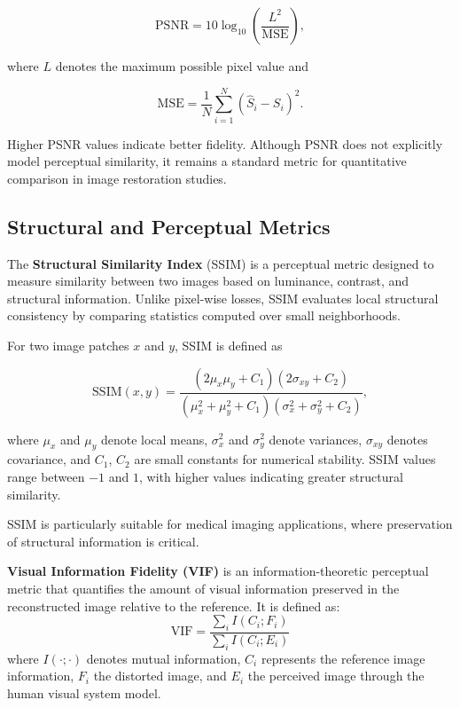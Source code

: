 \begin{equation}
\mathrm{PSNR} = 10 \log_{10} 
\left( \frac{L^2}{\mathrm{MSE}} \right),
\end{equation}

where $L$ denotes the maximum possible pixel value and

\begin{equation}
\mathrm{MSE} = \frac{1}{N} \sum_{i=1}^{N} 
(\hat{S}_i - S_i)^2.
\end{equation}

Higher PSNR values indicate better fidelity. Although PSNR does not explicitly model perceptual similarity, it remains a standard metric for quantitative comparison in image restoration studies.

\subsection{Structural and Perceptual Metrics}


The \textbf{Structural Similarity Index }(SSIM) is a perceptual metric designed to measure similarity between two images based on luminance, contrast, and structural information. Unlike pixel-wise losses, SSIM evaluates local structural consistency by comparing statistics computed over small neighborhoods.

For two image patches $x$ and $y$, SSIM is defined as

\begin{equation}
\mathrm{SSIM}(x, y) = 
\frac{(2\mu_x \mu_y + C_1)(2\sigma_{xy} + C_2)}
{(\mu_x^2 + \mu_y^2 + C_1)(\sigma_x^2 + \sigma_y^2 + C_2)},
\end{equation}

where $\mu_x$ and $\mu_y$ denote local means, $\sigma_x^2$ and $\sigma_y^2$ denote variances, $\sigma_{xy}$ denotes covariance, and $C_1$, $C_2$ are small constants for numerical stability. SSIM values range between $-1$ and $1$, with higher values indicating greater structural similarity.

SSIM is particularly suitable for medical imaging applications, where preservation of structural information is critical.

\textbf{Visual Information Fidelity (VIF)} is an information-theoretic perceptual metric that quantifies the amount of visual information preserved in the reconstructed image relative to the reference. It is defined as:
\begin{equation}
\mathrm{VIF} =
\frac{\sum_{i} I(C_i; F_i)}
{\sum_{i} I(C_i; E_i)}
\end{equation}
where $I(\cdot;\cdot)$ denotes mutual information, $C_i$ represents the reference image information, $F_i$ the distorted image, and $E_i$ the perceived image through the human visual system model.

